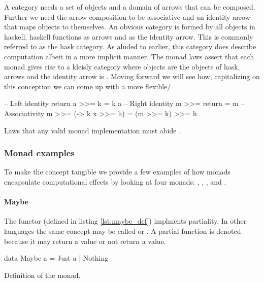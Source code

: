 A category needs a set of objects and a domain of arrows that can be
composed. Further we need the arrow composition to be associative and
an identity arrow that maps objects to themselves. An obvious category
is formed by all objects in haskell, haskell functions as arrows and
 as the identity arrow. This is commonly referred to as
the hask category. As aluded to earlier, this category does describe
computation albeit in a more implicit manner. The monad laws assert
that each monad gives rise to a kleisly category where objects are the
objects of hask, arrows  and the identity arrow is
. Moving forward we will see how, capitalizing on this
conception we can come up with a more flexible/

\begin{code}
\begin{haskellcode}
-- Left identity
return a >>= k = k a
-- Right identity
m >>= return = m
-- Associativity
m >>= (\x -> k x >>= h) = (m >>= k) >>= h
\end{haskellcode}
\label{lst:monad_laws}
\caption{Laws that any valid monad implementation must abide
  \cite{yorgeyTypeclassopedia2009}.}
\end{code}

\subsubsection{Monad examples}

To make the concept tangible we provide a few examples of how monads
encapsulate computational effects by looking at four monads: ,
 , , and .

\paragraph{Maybe}

The  functor (defined in listing \ref{lst:maybe_def})
implments partiality. In other languages the same concept may be
called  or . A partial function is denoted
 because it may return a value or not return a
value.

\begin{code}
\begin{haskellcode}
data Maybe a = Just a | Nothing
\end{haskellcode}
\label{lst:maybe_def}
\caption{Definition of the  monad.}
\end{code}

